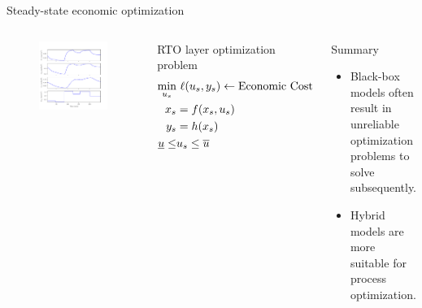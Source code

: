\documentclass[xcolor=dvipsnames, 8pt]{beamer} %
\begin{document}
\begin{frame}{Steady-state economic optimization}

	\begin{columns}
		\vspace{-0.1in}
		\begin{figure}
		  \includegraphics[page=5, height=0.7\textheight]{tworeac_plots.pdf}
		\end{figure}
	\begin{block}{RTO layer optimization problem}
		\begin{align*}
	\underset{u_s}{\textnormal{min}} & \ \ell(u_s, y_s) \leftarrow \textnormal{Economic Cost}\\
				x_s &= f(x_s, u_s) \\
				y_s &= h(x_s) \\
				\underline{u} \leq & u_s \leq \overline{u} 
		\end{align*}
	\end{block}
	\medskip
	\pause
	\begin{block}{Summary}
		\begin{itemize}
			\item Black-box models often result in unreliable
			optimization problems to solve subsequently.
			\item Hybrid models are more suitable for process optimization.
		\end{itemize}
	\end{block}
	\end{columns}
\pause


\end{frame}
\end{document}
